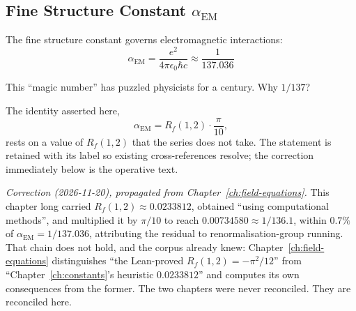 \subsection{Fine Structure Constant \texorpdfstring{$\alpha_{\text{EM}}$}{alpha\_EM}}

The fine structure constant governs electromagnetic interactions:
\begin{equation}
\alpha_{\text{EM}} = \frac{e^2}{4\pi\epsilon_0\hbar c} \approx \frac{1}{137.036}
\end{equation}

This ``magic number'' has puzzled physicists for a century. Why $1/137$? 

\begin{thm}\label{thm:fine-structure}
The identity asserted here,
\begin{equation}
\alpha_{\text{EM}} = R_f(1, 2) \cdot \frac{\pi}{10},
\end{equation}
rests on a value of $R_f(1,2)$ that the series does not take. The statement
is retained with its label so existing cross-references resolve; the
correction immediately below is the operative text.
\end{thm}

\noindent\emph{Correction (2026-11-20), propagated from
Chapter~\ref{ch:field-equations}.} This chapter long carried
$R_f(1,2) \approx 0.0233812$, obtained ``using computational methods'', and
multiplied it by $\pi/10$ to reach $0.00734580 \approx 1/136.1$, within
$0.7\%$ of $\alpha_{\text{EM}} = 1/137.036$, attributing the residual to
renormalisation-group running. That chain does not hold, and the corpus
already knew: Chapter~\ref{ch:field-equations} distinguishes ``the
Lean-proved $R_f(1,2) = -\pi^2/12$'' from ``Chapter~\ref{ch:constants}'s
heuristic $0.0233812$'' and computes its own consequences from the former.
The two chapters were never reconciled. They are reconciled here.

